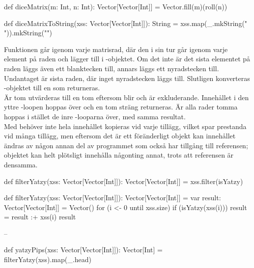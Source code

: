 \SubtaskSolved  \begin{Code}
def diceMatrix(m: Int, n: Int): Vector[Vector[Int]] =
  Vector.fill(m)(roll(n))
\end{Code}

\SubtaskSolved  \begin{Code}
def diceMatrixToString(xss: Vector[Vector[Int]]): String =
  xss.map(_.mkString(" ")).mkString("\n")
\end{Code}

\SubtaskSolved  Funktionen går igenom varje matrisrad, där den i sin tur går igenom
varje element på raden och lägger till i -objektet. Om det inte är
det sista elementet på raden läggs även ett blanktecken till, annars läggs ett
nyradstecken till. Undantaget är sista raden, där inget nyradstecken läggs till.
Slutligen konverteras -objektet till en  som
returneras.\\
Är  tom utvärderas  till en tom 
eftersom  blir  och  är exkluderande.
Innehållet i den yttre -loopen hoppas över och en tom sträng returneras.
Är alla rader tomma hoppas i stället de inre -looparna över, med samma resultat.\\
Med  behöver inte hela innehållet kopieras vid varje tillägg,
vilket spar prestanda vid många tillägg,
men eftersom det är ett föränderligt objekt kan innehållet ändras av någon annan
del av programmet som också har tillgång till referensen; objektet kan helt plötsligt
 innehålla någonting annat, trots att referensen är densamma.

\SubtaskSolved
\begin{Code}
def filterYatzy(xss: Vector[Vector[Int]]): Vector[Vector[Int]] =
  xss.filter(isYatzy)
\end{Code}

\SubtaskSolved
\begin{Code}
def filterYatzy(xss: Vector[Vector[Int]]): Vector[Vector[Int]] = {
	var result: Vector[Vector[Int]] = Vector()
	for (i <- 0 until xss.size) {
		if (isYatzy(xss(i))) result = result :+ xss(i)
	}
	result
}
\end{Code}

\SubtaskSolved  --

\SubtaskSolved  \begin{Code}
def yatzyPips(xss: Vector[Vector[Int]]): Vector[Int] =
  filterYatzy(xss).map(_.head)
\end{Code}

